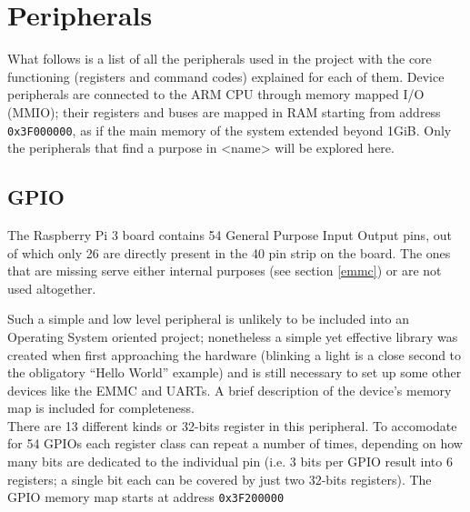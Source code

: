\documentclass[12pt,a4paper,openright,twoside]{report}
\begin{document}
\section{Peripherals}
What follows is a list of all the peripherals used in the project with the core
functioning (registers and command codes) explained for each of them.
Device peripherals are connected to the ARM CPU through memory mapped I/O (MMIO);
their registers and buses are mapped in RAM starting from address {\tt 0x3F000000},
as if the main memory of the system extended beyond 1GiB.
Only the peripherals that find a purpose in <name> will be explored here.

\subsection{GPIO}
The Raspberry Pi 3 board contains 54 General Purpose Input Output pins, out of which
only 26 are directly present in the 40 pin strip on the board. The ones that are
missing serve either internal purposes (see section \ref{emmc}) or are not used
altogether.

Such a simple and low level peripheral is unlikely
 to be included into an Operating System oriented project; nonetheless a simple yet effective 
library was created when first approaching the hardware (blinking a light 
is a close second to the obligatory ``Hello World'' example) and is still necessary
to set up some other devices like the EMMC and UARTs.
A brief description of the device's memory map is included for completeness.
\\
There are 13 different kinds or 32-bits register in this peripheral. To accomodate for
54 GPIOs each register class can repeat a number of times, depending on how
many bits are dedicated to the individual pin (i.e. 3 bits per GPIO result into 6
registers; a single bit each can be covered by just two 32-bits registers).
The GPIO memory map starts at address {\tt 0x3F200000}
\end{document}
